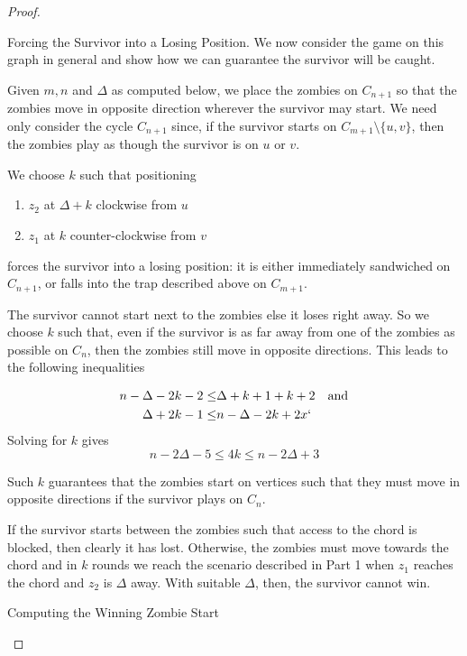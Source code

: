 \begin{proof}
\begin{proofpart}
 \end{proofpart}

 \begin{proofpart} Forcing the Survivor into a Losing Position.
  We now consider the game on this graph in general and show
  how we can guarantee the survivor will be caught.

  Given $m, n$ and $\Delta$ as computed below, we place the
  zombies on $C_{n+1}$ so that the zombies move in
  opposite direction wherever the survivor may start.
  We need only consider the cycle $C_{n+1}$ since, if the survivor
  starts on $C_{m+1} \setminus \{u, v\}$, then the zombies play as
  though the survivor is on $u$ or $v$.

  We choose $k$ such that positioning
  \begin{enumerate}
   \item $z_2$ at $\Delta + k$ clockwise from $u$
   \item $z_1$ at $k$ counter-clockwise from $v$
  \end{enumerate}
  forces the survivor into a losing position: it is either immediately sandwiched on $C_{n+1}$,
  or falls into the trap described above on $C_{m+1}$.

  The survivor cannot start next to the zombies else it loses right away.
  So we choose $k$ such that, even if the survivor is as far
  away from one of the zombies as possible on $C_n$, then the zombies
  still move in opposite directions. This leads to the following inequalities

  \begin{align*}
   n - \Delta - 2k - 2 \leq & \Delta + k +1 + k +2 & \text{and} \\
   \Delta + 2k -1 \leq      & n - \Delta -2k +2x`
  \end{align*}
  Solving for $k$ gives
  \[ n - 2\Delta -5 \leq 4k \leq n-2\Delta +3 \]

  Such $k$ guarantees that the zombies start on vertices such that they must
  move in opposite directions if the survivor plays on $C_n$.

  If the survivor starts between the zombies such that
  access to the chord is blocked, then clearly it has lost. Otherwise,
   the zombies must move towards the chord and in $k$ rounds we reach the
    scenario described in Part 1 when $z_1$ reaches the chord and $z_2$ is
    $\Delta$ away. With suitable $\Delta$, then, the survivor cannot win.
 \end{proofpart}

 \begin{proofpart} Computing the Winning Zombie Start


\end{proofpart}
\end{proof}
